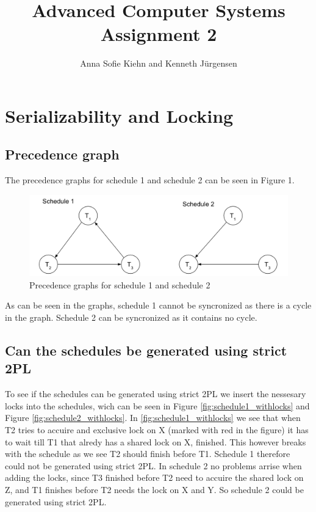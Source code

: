 \documentclass{article}
\theoremstyle{plain}
\theoremstyle{nonumberplain}
\begin{document}
\title{Advanced Computer Systems \\ Assignment 2}

\author{Anna Sofie Kiehn and Kenneth Jürgensen}

\maketitle

\section{Serializability and Locking}

\subsection{Precedence graph}

The precedence graphs for schedule 1 and schedule 2 can be seen in Figure 1. 

\begin{figure}[h]
    \centering
    \includegraphics[width=14cm]{graph}
    \caption{Precedence graphs for schedule 1 and schedule 2}
\end{figure} 

As can be seen in the graphs, schedule 1 cannot be syncronized as there is a cycle in the graph. Schedule 2 can be syncronized as it contains no cycle. 

\subsection{Can the schedules be generated using strict 2PL}

To see if the schedules can be generated using strict 2PL we insert the nessesary locks into the schedules, wich can be seen in Figure \ref{fig:schedule1_withlocks} and Figure \ref{fig:schedule2_withlocks}.
In \ref{fig:schedule1_withlocks} we see that when T2 tries to accuire and exclusive lock on X (marked with red in the figure) it has to wait till T1 that alredy has a shared lock on X, finished. This however breaks with the schedule as we see T2 should finish before T1. Schedule 1 therefore could not be generated using strict 2PL. 
In schedule 2 no problems arrise when adding the locks, since T3 finished before T2 need to accuire the shared lock on Z, and T1 finishes before T2 needs the lock on X and Y. So schedule 2 could be generated using strict 2PL. 
\end{document}
